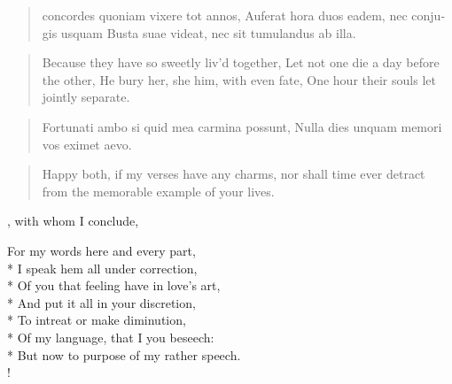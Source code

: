 \begin{latin}
\begin{verse}
concordes quoniam vixere tot annos,
Auferat hora duos eadem, nec conjugis usquam
Busta suae videat, nec sit tumulandus ab illa.
\end{verse}
\end{latin}
\translationrule%
\begin{verse}%
Because they have so sweetly liv'd together,
Let not one die a day before the other,
He bury her, she him, with even fate,
One hour their souls let jointly separate.
\end{verse}%

\begin{latin}
\begin{verse}
Fortunati ambo si quid mea carmina possunt,
Nulla dies unquam memori vos eximet aevo.
\end{verse}
\end{latin}
\translationrule%
\begin{verse}%
Happy both, if my verses have any charms,
nor shall time ever detract from the memorable example of your lives.
\end{verse}%

, with whom I conclude,

{\gothfont%
\begin{versewithlinenos}{2}{1}{1}%
For my words here and every part,\\*
I speak hem all under correction,\\*
Of you that feeling have in love's art,\\*
And put it all in your discretion,\\*
To intreat or make diminution,\\*
Of my language, that I you beseech:\\*
But now to purpose of my rather speech.\\!
\end{versewithlinenos}%
}%
